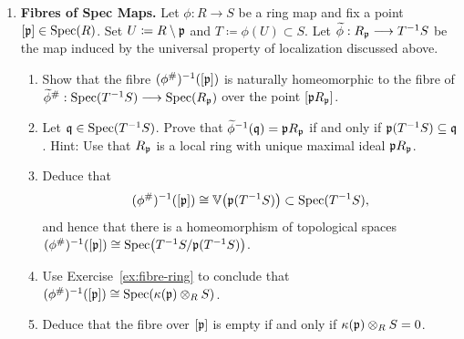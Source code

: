 \documentclass[12pt,reqno]{amsart}
\begin{document}
\begin{enumerate}[leftmargin=*, resume=problems]
\item \textbf{Fibres of Spec Maps.} Let $\phi:R\to S$ be a ring map and fix a point $[\mathfrak{p}]\in \operatorname{Spec}(R)$. Set $U \coloneqq R \setminus \mathfrak{p}$ and $T\coloneqq \phi(U) \subset S$. Let $\widetilde{\phi}:R_{\mathfrak{p}}\longrightarrow T^{-1}S$ be the map induced by the universal property of localization discussed above. 
\begin{enumerate}
	\item Show that the fibre $(\phi^{\#})^{-1}([\mathfrak{p}])$ is naturally homeomorphic to the fibre of $\widetilde{\phi}^{\#}:\operatorname{Spec}(T^{-1}S)\longrightarrow \operatorname{Spec}(R_{\mathfrak{p}})$ over the point $[\mathfrak{p} R_{\mathfrak{p}}]$.
	\item Let $\mathfrak{q}\in \operatorname{Spec}(T^{-1}S)$. Prove that $\widetilde{\phi}^{-1}(\mathfrak{q})=\mathfrak{p} R_{\mathfrak{p}}$ if and only if $\mathfrak{p}(T^{-1}S)\subseteq \mathfrak{q}$. Hint: Use that $R_{\mathfrak{p}}$ is a local ring with unique maximal ideal $\mathfrak{p} R_{\mathfrak{p}}$.
	\item Deduce that
	\[
	(\phi^{\#})^{-1}([\mathfrak{p}])\cong \mathbb{V}\!\left(\mathfrak{p}(T^{-1}S)\right)\subset \operatorname{Spec}(T^{-1}S),
	\]
	and hence that there is a homeomorphism of topological spaces $(\phi^{\#})^{-1}([\mathfrak{p}]) \cong \operatorname{Spec}\!\left(T^{-1}S/\mathfrak{p}(T^{-1}S)\right)$.
	\item Use Exercise~\ref{ex:fibre-ring} to conclude that $(\phi^{\#})^{-1}([\mathfrak{p}]) \cong \operatorname{Spec}(\kappa(\mathfrak{p})\otimes_R S)$.
	\item Deduce that the fibre over $[\mathfrak{p}]$ is empty if and only if $\kappa(\mathfrak{p})\otimes_R S=0$.
\end{enumerate}


\end{enumerate}
\end{document}
